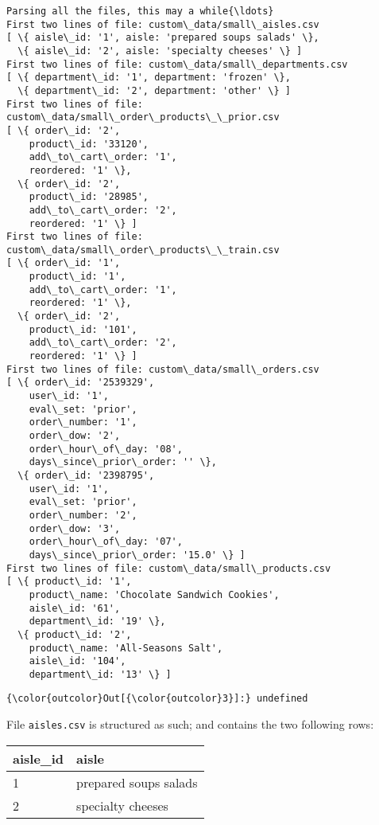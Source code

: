 \documentclass[11pt]{article}
\begin{document}
    \begin{Verbatim}[commandchars=\\\{\}]
Parsing all the files, this may a while{\ldots}
First two lines of file: custom\_data/small\_aisles.csv
[ \{ aisle\_id: '1', aisle: 'prepared soups salads' \},
  \{ aisle\_id: '2', aisle: 'specialty cheeses' \} ]
First two lines of file: custom\_data/small\_departments.csv
[ \{ department\_id: '1', department: 'frozen' \},
  \{ department\_id: '2', department: 'other' \} ]
First two lines of file: custom\_data/small\_order\_products\_\_prior.csv
[ \{ order\_id: '2',
    product\_id: '33120',
    add\_to\_cart\_order: '1',
    reordered: '1' \},
  \{ order\_id: '2',
    product\_id: '28985',
    add\_to\_cart\_order: '2',
    reordered: '1' \} ]
First two lines of file: custom\_data/small\_order\_products\_\_train.csv
[ \{ order\_id: '1',
    product\_id: '1',
    add\_to\_cart\_order: '1',
    reordered: '1' \},
  \{ order\_id: '2',
    product\_id: '101',
    add\_to\_cart\_order: '2',
    reordered: '1' \} ]
First two lines of file: custom\_data/small\_orders.csv
[ \{ order\_id: '2539329',
    user\_id: '1',
    eval\_set: 'prior',
    order\_number: '1',
    order\_dow: '2',
    order\_hour\_of\_day: '08',
    days\_since\_prior\_order: '' \},
  \{ order\_id: '2398795',
    user\_id: '1',
    eval\_set: 'prior',
    order\_number: '2',
    order\_dow: '3',
    order\_hour\_of\_day: '07',
    days\_since\_prior\_order: '15.0' \} ]
First two lines of file: custom\_data/small\_products.csv
[ \{ product\_id: '1',
    product\_name: 'Chocolate Sandwich Cookies',
    aisle\_id: '61',
    department\_id: '19' \},
  \{ product\_id: '2',
    product\_name: 'All-Seasons Salt',
    aisle\_id: '104',
    department\_id: '13' \} ]

    \end{Verbatim}

\begin{Verbatim}[commandchars=\\\{\}]
{\color{outcolor}Out[{\color{outcolor}3}]:} undefined
\end{Verbatim}
            
    File \texttt{aisles.csv} is structured as such; and contains the two
following rows:

\begin{longtable}[]{@{}ll@{}}
\toprule
aisle\_id & aisle\tabularnewline
\midrule
\endhead
1 & prepared soups salads\tabularnewline
2 & specialty cheeses\tabularnewline
\bottomrule
\end{longtable}
\end{document}
